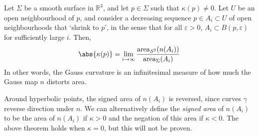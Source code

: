 \begin{theorem} \label{thm:2.10}
	Let $\Sigma$ be a smooth surface in $\mathbb R^3$, and let $p \in \Sigma$ such that $\kappa(p) \neq 0$.
	Let $U$ be an open neighbourhood of $p$, and consider a decreasing sequence $p \in A_i \subset U$ of open neighbourhoods that `shrink to $p$', in the sense that for all $\varepsilon > 0$, $A_i \subset B(p,\varepsilon)$ for sufficiently large $i$.
	Then,
	\begin{align*}
		\abs{\kappa(p)} = \lim_{i \to \infty} \frac{\mathrm{area}_{S^2} (n(A_i))}{\mathrm{area}_{\Sigma} (A_i)}
	\end{align*}
	In other words, the Gauss curvature is an infinitesimal measure of how much the Gauss map $n$ distorts area.
\end{theorem}

\begin{remark}
	Around hyperbolic points, the signed area of $n(A_i)$ is reversed, since curves $\gamma$ reverse direction under $n$.
	We can alternatively define the \textit{signed area} of $n(A_i)$ to be the area of $n(A_i)$ if $\kappa > 0$ and the negation of this area if $\kappa < 0$.
	The above theorem holds when $\kappa = 0$, but this will not be proven.
\end{remark}

